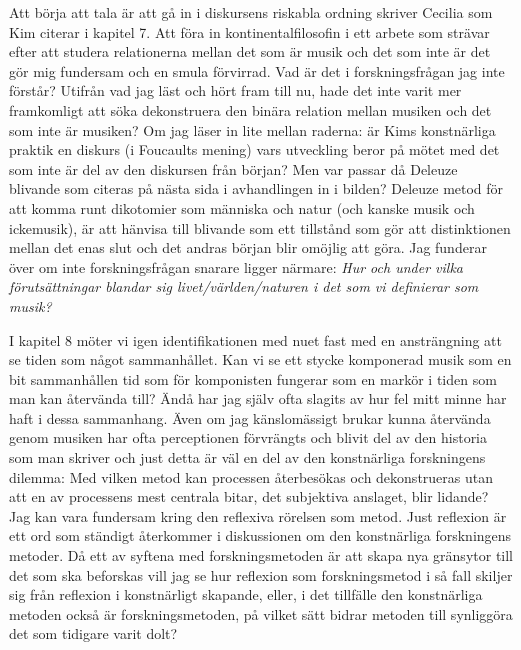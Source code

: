 \documentclass[a4paper]{article}
\begin{document}

Att börja att tala är att gå in i diskursens riskabla ordning skriver Cecilia \citet{rosengren2009} som Kim citerar i kapitel 7. Att föra in kontinentalfilosofin i ett arbete som strävar efter att studera relationerna mellan det som är musik och det som inte är det gör mig fundersam och en smula förvirrad. Vad är det i forskningsfrågan jag inte förstår? Utifrån vad jag läst och hört fram till nu, hade det inte varit mer framkomligt att söka dekonstruera den binära relation mellan musiken och det som inte är musiken? Om jag läser in lite mellan raderna: är Kims konstnärliga praktik en diskurs (i Foucaults mening) vars utveckling beror på mötet med det som inte är del av den diskursen från början? Men var passar då Deleuze blivande som citeras på nästa sida i avhandlingen in i bilden? Deleuze metod för att komma runt dikotomier som människa och natur (och kanske musik och ickemusik), är att hänvisa till blivande som ett tillstånd som gör att distinktionen mellan det enas slut och det andras början blir omöjlig att göra. Jag funderar över om inte forskningsfrågan snarare ligger närmare: \emph{Hur och under vilka förutsättningar blandar sig livet/världen/naturen i det som vi definierar som musik?}

I kapitel 8 möter vi igen identifikationen med nuet fast med en ansträngning att se tiden som något sammanhållet. Kan vi se ett stycke komponerad musik som en bit sammanhållen tid som för komponisten fungerar som en markör i tiden som man kan återvända till? Ändå har jag själv ofta slagits av hur fel mitt minne har haft i dessa sammanhang. Även om jag känslomässigt brukar kunna återvända genom musiken har ofta perceptionen förvrängts och blivit del av den historia som man skriver och just detta är väl en del av den konstnärliga forskningens dilemma: Med vilken metod kan processen återbesökas och dekonstrueras utan att en av processens mest centrala bitar, det subjektiva anslaget, blir lidande? Jag kan vara fundersam kring den reflexiva rörelsen som metod. Just reflexion är ett ord som ständigt återkommer i diskussionen om den konstnärliga forskningens metoder. Då ett av syftena med forskningsmetoden är att skapa nya gränsytor till det som ska beforskas vill jag se hur reflexion som forskningsmetod i så fall skiljer sig från reflexion i konstnärligt skapande, eller, i det tillfälle den konstnärliga metoden också är forskningsmetoden, på vilket sätt bidrar metoden till synliggöra det som tidigare varit dolt?
\end{document}
